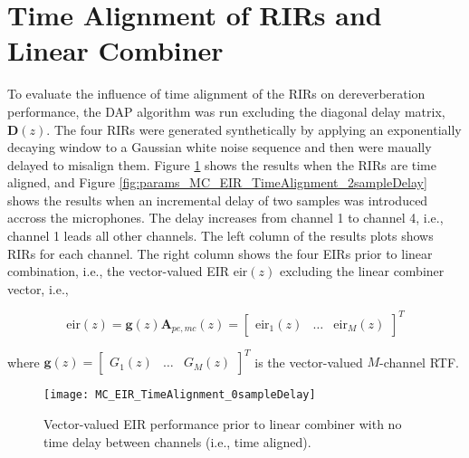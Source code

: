 \section{Time Alignment of RIRs and Linear Combiner}

To evaluate the influence of time alignment of the RIRs on dereverberation performance, the DAP algorithm was run excluding the diagonal delay matrix, $\boldsymbol{D}(z)$. The four RIRs were generated synthetically by applying an exponentially decaying window to a Gaussian white noise sequence and then were maually delayed to misalign them. Figure \ref{fig:params_MC_EIR_TimeAlignment_0sampleDelay} shows the results when the RIRs are time aligned, and Figure \ref{fig:params_MC_EIR_TimeAlignment_2sampleDelay} shows the results when an incremental delay of two samples was introduced accross the microphones. The delay increases from channel 1 to channel 4, i.e., channel 1 leads all other channels. The left column of the results plots shows RIRs for each channel. The right column shows the four EIRs prior to linear combination, i.e., the vector-valued EIR $\boldsymbol{\mathrm{eir}}(z)$ excluding the linear combiner vector, i.e.,

\begin{equation}
	\boldsymbol{\mathrm{eir}}(z) = \boldsymbol{g}(z)\boldsymbol{A}_{pe,mc}(z) = \begin{bmatrix} \mathrm{eir}_1 (z)& \dots & \mathrm{eir}_M(z) \end{bmatrix}^T
\end{equation}

\noindent
where $\boldsymbol{g}(z) = \begin{bmatrix} G_1(z)& \dots & G_M(z) \end{bmatrix}^T$ is the vector-valued $M$-channel RTF.



\begin{figure}[H]
	\texttt{[image: MC\_EIR\_TimeAlignment\_0sampleDelay]}
	\centering
	\caption[DAP dereverberation performance pre-linear combiner for time-aligned RIRs]{Vector-valued EIR performance prior to linear combiner with no time delay between channels (i.e., time aligned).}
	\label{fig:params_MC_EIR_TimeAlignment_0sampleDelay}
\end{figure}

